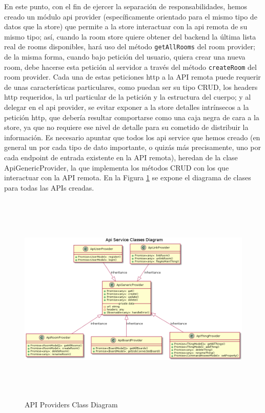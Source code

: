 En este punto, con el fin de ejercer la separación de responsabilidades, hemos creado un módulo api provider (específicamente orientado para el mismo tipo de datos que la store) que permite a la store interactuar con la api remota de su mismo tipo; así, cuando la room store quiere obtener del backend la última lista real de rooms disponibles, hará uso del método \verb|getAllRooms| del room provider; de la misma forma, cuando bajo petición del usuario, quiera crear una nueva room, debe hacerse esta petición al servidor a través del método \verb|createRoom| del room provider. Cada una de estas peticiones http a la API remota puede requerir de unas características particulares, como puedan ser su tipo CRUD, los headers http requeridos, la url particular de la petición y la estructura del cuerpo; y al delegar en el api provider, se evitar exponer a la store detalles intrínsecos a la petición http, que debería resultar comportarse como una caja negra de cara a la store, ya que no requiere ese nivel de detalle para su cometido de distribuir la información. 
Es necesario apuntar que todos los api service que hemos creado (en general un por cada tipo de dato importante, o quizás más precisamente, uno por cada endpoint de entrada existente en la API remota), heredan de la clase ApiGenericProvider, la que implementa los métodos CRUD con los que interactuar con la API remota. En la Figura \ref{fig:api-services} se expone el diagrama de clases para todas las APIs creadas.

\begin{figure}[hbt!]
\centering
\includegraphics[height=4in]{figures/diagrams/front/architecture/api-services.png}
\caption[api-services]{API Providers Class Diagram\footnotemark}
\label{fig:api-services}
\end{figure}

